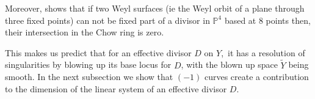 \documentclass[12pt]{article}
\newtheorem{remark}[equation]{Remark}
\numberwithin{equation}{section}
\numberwithin{subeq}{equation}
\begin{document}
Moreover, \cite[Corollary 8.3]{DM1} shows that
if two Weyl surfaces (ie the Weyl orbit of a plane through three fixed points)
can not be fixed part of a divisor in $\mathbb{P}^4$ based at $8$ points then,
their intersection in the Chow ring is zero.

This makes us predict that for an effective divisor $D$ on $Y$,\
it has a resolution of singularities by blowing up its base locus for $D$,
with the blown up space $\tilde{Y}$ being smooth.
In the next subsection we show that $(-1)$
curves create a contribution to the dimension of the linear system of an effective divisor $D$.

\end{document}
